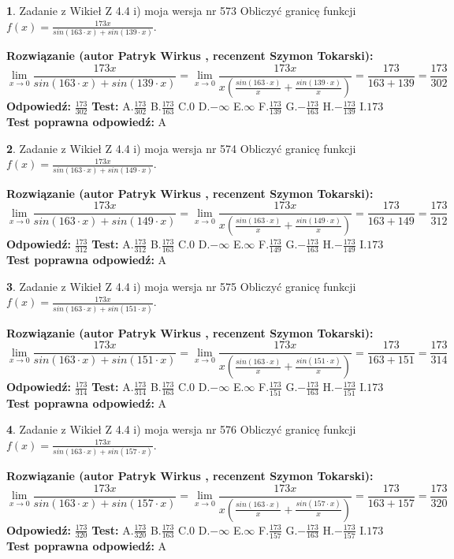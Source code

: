 \documentclass[12pt, a4paper]{article}
\theoremstyle{definition} %
\newtheorem{zad}{}
\newcommand{\zadStart}[1]{\begin{zad}#1\newline}
\newcommand{\zadStop}{\end{zad}}
\newcommand{\rozwStart}[2]{\noindent \textbf{Rozwiązanie (autor #1 , recenzent #2): }\newline}
\newcommand{\rozwStop}{\newline}
\newcommand{\odpStart}{\noindent \textbf{Odpowiedź:}\newline}
\newcommand{\odpStop}{\newline}
\newcommand{\testStart}{\noindent \textbf{Test:}\newline}
\newcommand{\testStop}{\newline}
\newcommand{\kluczStart}{\noindent \textbf{Test poprawna odpowiedź:}\newline}
\newcommand{\kluczStop}{\newline}
\begin{document}
\zadStart{Zadanie z Wikieł Z 4.4 i) moja wersja nr 573}
Obliczyć granicę funkcji $f(x)=\frac{173x}{sin(163\cdot x) +sin(139\cdot x)}$.
\zadStop
\rozwStart{Patryk Wirkus}{Szymon Tokarski}
$$\lim\limits_{x\to 0}\frac{173x}{sin(163\cdot x) +sin(139\cdot x)}=\lim\limits_{x\to 0}\frac{173x}{x(\frac{sin(163\cdot x)}{x}+\frac{sin(139\cdot x)}{x})}=\frac{173}{163+139} = \frac{173}{302}$$
\rozwStop
\odpStart
$\frac{173}{302}$
\odpStop
\testStart
A.$\frac{173}{302}$
B.$\frac{173}{163}$
C.$0$
D.$-\infty$
E.$\infty$
F.$\frac{173}{139}$
G.$-\frac{173}{163}$
H.$-\frac{173}{139}$
I.$173$
\testStop
\kluczStart
A
\kluczStop



\zadStart{Zadanie z Wikieł Z 4.4 i) moja wersja nr 574}
Obliczyć granicę funkcji $f(x)=\frac{173x}{sin(163\cdot x) +sin(149\cdot x)}$.
\zadStop
\rozwStart{Patryk Wirkus}{Szymon Tokarski}
$$\lim\limits_{x\to 0}\frac{173x}{sin(163\cdot x) +sin(149\cdot x)}=\lim\limits_{x\to 0}\frac{173x}{x(\frac{sin(163\cdot x)}{x}+\frac{sin(149\cdot x)}{x})}=\frac{173}{163+149} = \frac{173}{312}$$
\rozwStop
\odpStart
$\frac{173}{312}$
\odpStop
\testStart
A.$\frac{173}{312}$
B.$\frac{173}{163}$
C.$0$
D.$-\infty$
E.$\infty$
F.$\frac{173}{149}$
G.$-\frac{173}{163}$
H.$-\frac{173}{149}$
I.$173$
\testStop
\kluczStart
A
\kluczStop



\zadStart{Zadanie z Wikieł Z 4.4 i) moja wersja nr 575}
Obliczyć granicę funkcji $f(x)=\frac{173x}{sin(163\cdot x) +sin(151\cdot x)}$.
\zadStop
\rozwStart{Patryk Wirkus}{Szymon Tokarski}
$$\lim\limits_{x\to 0}\frac{173x}{sin(163\cdot x) +sin(151\cdot x)}=\lim\limits_{x\to 0}\frac{173x}{x(\frac{sin(163\cdot x)}{x}+\frac{sin(151\cdot x)}{x})}=\frac{173}{163+151} = \frac{173}{314}$$
\rozwStop
\odpStart
$\frac{173}{314}$
\odpStop
\testStart
A.$\frac{173}{314}$
B.$\frac{173}{163}$
C.$0$
D.$-\infty$
E.$\infty$
F.$\frac{173}{151}$
G.$-\frac{173}{163}$
H.$-\frac{173}{151}$
I.$173$
\testStop
\kluczStart
A
\kluczStop



\zadStart{Zadanie z Wikieł Z 4.4 i) moja wersja nr 576}
Obliczyć granicę funkcji $f(x)=\frac{173x}{sin(163\cdot x) +sin(157\cdot x)}$.
\zadStop
\rozwStart{Patryk Wirkus}{Szymon Tokarski}
$$\lim\limits_{x\to 0}\frac{173x}{sin(163\cdot x) +sin(157\cdot x)}=\lim\limits_{x\to 0}\frac{173x}{x(\frac{sin(163\cdot x)}{x}+\frac{sin(157\cdot x)}{x})}=\frac{173}{163+157} = \frac{173}{320}$$
\rozwStop
\odpStart
$\frac{173}{320}$
\odpStop
\testStart
A.$\frac{173}{320}$
B.$\frac{173}{163}$
C.$0$
D.$-\infty$
E.$\infty$
F.$\frac{173}{157}$
G.$-\frac{173}{163}$
H.$-\frac{173}{157}$
I.$173$
\testStop
\kluczStart
A
\kluczStop
\end{document}
